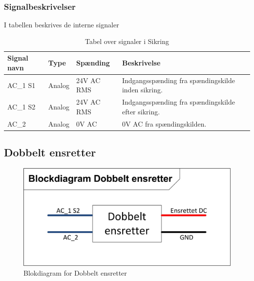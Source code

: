 \subsubsection{Signalbeskrivelser}
I tabellen beskrives de interne signaler
\begin{table}[H]
\begin{tabular}{|p{3cm}|p{3cm}|p{3cm}|p{4.5cm}|} \hline
\cellcolor[gray]{0.85}Signal navn& \cellcolor[gray]{0.85}Type &\cellcolor[gray]{0.85}Spænding&\cellcolor[gray]{0.85}Beskrivelse\\ \hline
AC\_1 S1 & Analog  & 24V AC RMS & Indgangsspænding fra spændingskilde inden sikring.\\  \hline
AC\_1 S2 & Analog & 24V AC RMS & Indgangsspænding fra spændingskilde efter sikring. \\  \hline
AC\_2 & Analog & 0V AC & 0V AC fra spændingskilden.\\  \hline

\end{tabular}
\caption{Tabel over signaler i Sikring}
\label{table:SikringSignaler}
\end{table}
\newpage
\subsection{Dobbelt ensretter}
\begin{figure}[H]
\centering
\includegraphics[scale=1]{billeder/DobbeltensretterBlok}
\caption{Blokdiagram for Dobbelt ensretter}
\label{fig:DobbeltensretterBlok}
\end{figure}

